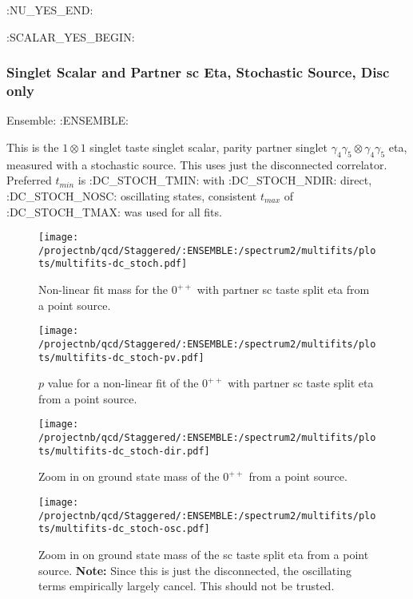 \clearpage
:NU_YES_END:

:SCALAR_YES_BEGIN:
\subsubsection{Singlet Scalar and Partner sc Eta, Stochastic Source, Disc only}

Ensemble: :ENSEMBLE:

This is the $1 \otimes 1$ singlet taste singlet scalar, parity partner singlet $\gamma_4 \gamma_5 \otimes \gamma_4 \gamma_5$ eta, measured with a stochastic source. This uses just the disconnected correlator. Preferred $t_{min}$ is :DC_STOCH_TMIN: with :DC_STOCH_NDIR: direct, :DC_STOCH_NOSC: oscillating states, consistent $t_{max}$ of :DC_STOCH_TMAX: was used for all fits.

\begin{multicols}{2}
\begin{figure}[H]
\centering
\texttt{[image: /projectnb/qcd/Staggered/:ENSEMBLE:/spectrum2/multifits/plots/multifits-dc\_stoch.pdf]}
\caption{Non-linear fit mass for the $0^{++}$ with partner sc taste split eta from a point source.}
\end{figure}
\columnbreak
\begin{figure}[H]
\centering
\texttt{[image: /projectnb/qcd/Staggered/:ENSEMBLE:/spectrum2/multifits/plots/multifits-dc\_stoch-pv.pdf]}
\caption{$p$ value for a non-linear fit of the $0^{++}$ with partner sc taste split eta from a point source.}
\end{figure}
\end{multicols}

\begin{multicols}{2}
\begin{figure}[H]
\centering
\texttt{[image: /projectnb/qcd/Staggered/:ENSEMBLE:/spectrum2/multifits/plots/multifits-dc\_stoch-dir.pdf]}
\caption{Zoom in on ground state mass of the $0^{++}$ from a point source.}
\end{figure}
\columnbreak
\begin{figure}[H]
\centering
\texttt{[image: /projectnb/qcd/Staggered/:ENSEMBLE:/spectrum2/multifits/plots/multifits-dc\_stoch-osc.pdf]}
\caption{Zoom in on ground state mass of the sc taste split eta from a point source. {\textbf{Note:}} Since this is just the disconnected, the oscillating terms empirically largely cancel. This should not be trusted.}
\end{figure}
\end{multicols}

